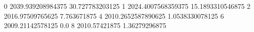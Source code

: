 0 2039.939208984375 30.727783203125
1 2024.4007568359375 15.1893310546875
2 2016.97509765625 7.763671875
4 2010.2652587890625 1.0538330078125
6 2009.21142578125 0.0
8 2010.57421875 1.36279296875
